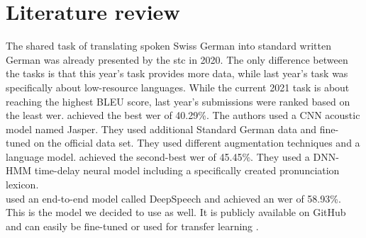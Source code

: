 \section{Literature review}
The shared task of translating spoken Swiss German into standard written German was already presented by the \gls{stc} in 2020. The only difference between the tasks is that this year's task provides
more data, while last year's task was specifically about low-resource languages. While the current 2021 task is about reaching the highest BLEU score, last year's submissions were ranked based on the
least \gls{wer}. \citet{buechi2020} achieved the best \gls{wer} of 40.29\%. The authors used a CNN acoustic model named Jasper. They used additional Standard German data and fine-tuned on the official
data set. They used different augmentation techniques and a language model. \cite{Kew2020} achieved the second-best \gls{wer} of 45.45\%. They used a DNN-HMM time-delay neural model including a specifically created pronunciation lexicon.   \\
\citet{Agarwal2020LTLUDEAL} used an end-to-end model called DeepSpeech and achieved an \gls{wer} of 58.93\%. This is the model we decided to use as well. It is publicly available on GitHub and can easily be fine-tuned or used for transfer learning \citet{pluss2020}.
